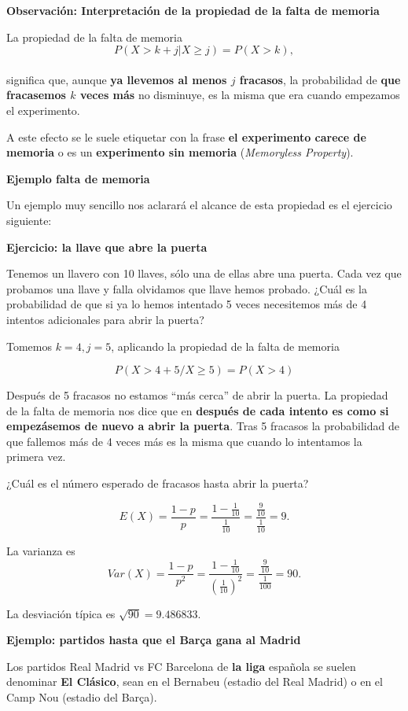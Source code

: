 \documentclass[
  letterpaper,
  DIV=11,
  numbers=noendperiod]{scrreprt}
\begin{document}
\textbf{Observación: Interpretación de la propiedad de la falta de
memoria}

La propiedad de la falta de memoria \[
P(X> k+j\big|X \geq j)=P(X > k),
\]\\
significa que, aunque \textbf{ya llevemos al menos \(j\) fracasos}, la
probabilidad de \textbf{que fracasemos \(k\) veces más} no disminuye, es
la misma que era cuando empezamos el experimento.

A este efecto se le suele etiquetar con la frase \textbf{el experimento
carece de memoria} o es un \textbf{experimento sin memoria}
(\emph{Memoryless Property}).

\textbf{Ejemplo falta de memoria}

Un ejemplo muy sencillo nos aclarará el alcance de esta propiedad es el
ejercicio siguiente:

\textbf{Ejercicio: la llave que abre la puerta}

Tenemos un llavero con 10 llaves, sólo una de ellas abre una puerta.
Cada vez que probamos una llave y falla olvidamos que llave hemos
probado. ¿Cuál es la probabilidad de que si ya lo hemos intentado 5
veces necesitemos más de 4 intentos adicionales para abrir la puerta?

Tomemos \(k=4,j=5\), aplicando la propiedad de la falta de memoria

\[
P(X> 4+5/X \geq 5)=P(X > 4)
\]

Después de 5 fracasos no estamos ``más cerca'' de abrir la puerta. La
propiedad de la falta de memoria nos dice que en \textbf{después de cada
intento es como si empezásemos de nuevo a abrir la puerta}. Tras 5
fracasos la probabilidad de que fallemos más de 4 veces más es la misma
que cuando lo intentamos la primera vez.

¿Cuál es el número esperado de fracasos hasta abrir la puerta?

\[
E(X)=\frac{1-p}{p}=\frac{1-\frac{1}{10}}{\frac{1}{10}}=\frac{\frac{9}{10}}{\frac{1}{10}}=9.
\]

La varianza es \[
Var(X)=\frac{1-p}{p^2}=\frac{1-\frac{1}{10}}{\left(\frac{1}{10}\right)^2}=\frac{\frac{9}{10}}{\frac{1}{100}}=
90.
\]

La desviación típica es \(\sqrt{90}=9.486833.\)

\textbf{Ejemplo: partidos hasta que el Barça gana al Madrid}

Los partidos Real Madrid vs FC Barcelona de \textbf{la liga} española se
suelen denominar \textbf{El Clásico}, sean en el Bernabeu (estadio del
Real Madrid) o en el Camp Nou (estadio del Barça).
\end{document}
